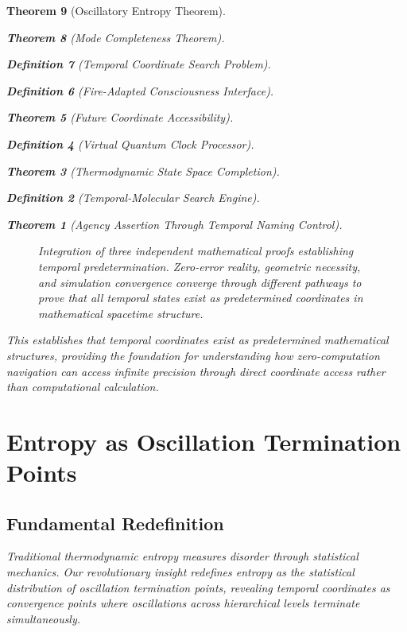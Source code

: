 \documentclass[12pt,a4paper]{article}
\newtheorem{theorem}{Theorem}[section]
\newtheorem{definition}[theorem]{Definition}
\begin{document}
\begin{theorem}[Oscillatory Entropy Theorem]
\begin{theorem}[Mode Completeness Theorem]
\begin{enumerate}
\begin{definition}[Temporal Coordinate Search Problem]
\begin{algorithm}
\begin{definition}[Fire-Adapted Consciousness Interface]
\begin{theorem}[Future Coordinate Accessibility]
\begin{definition}[Virtual Quantum Clock Processor]
\begin{itemize}
\begin{itemize}
\begin{theorem}[Thermodynamic State Space Completion]
\begin{definition}[Temporal-Molecular Search Engine]
\begin{theorem}[Agency Assertion Through Temporal Naming Control]
\begin{remark}
\begin{figure}[h]
\caption{Integration of three independent mathematical proofs establishing temporal predetermination. Zero-error reality, geometric necessity, and simulation convergence converge through different pathways to prove that all temporal states exist as predetermined coordinates in mathematical spacetime structure.}
\label{fig:three_pillars}
\end{figure}

This establishes that temporal coordinates exist as predetermined mathematical structures, providing the foundation for understanding how zero-computation navigation can access infinite precision through direct coordinate access rather than computational calculation.

\section{Entropy as Oscillation Termination Points}

\subsection{Fundamental Redefinition}

Traditional thermodynamic entropy measures disorder through statistical mechanics. Our revolutionary insight redefines entropy as the statistical distribution of oscillation termination points, revealing temporal coordinates as convergence points where oscillations across hierarchical levels terminate simultaneously.


\end{remark}
\end{theorem}
\end{definition}
\end{theorem}
\end{itemize}
\end{itemize}
\end{definition}
\end{theorem}
\end{definition}
\end{algorithm}
\end{definition}
\end{enumerate}
\end{theorem}
\end{theorem}
\end{document}
